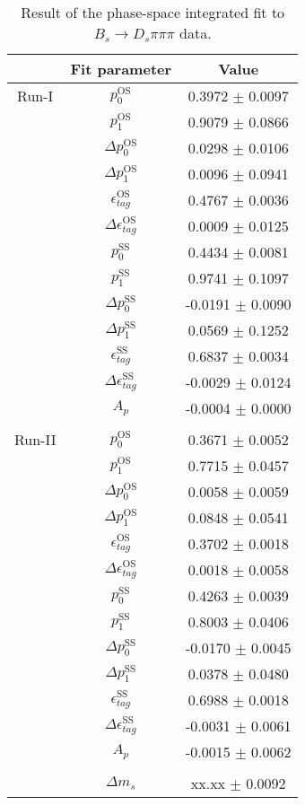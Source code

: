 \begin{table}[h]
\centering
\caption{Result of the phase-space integrated fit to $B_s \to D_s \pi \pi \pi$ data.}
\begin{tabular}{c c c}
\hline
\hline
& Fit parameter & Value \\
\hline
Run-I & $p_{0}^{\text{OS}}$ & 0.3972 $\pm$ 0.0097\\
&$p_{1}^{\text{OS}}$  & 0.9079 $\pm$ 0.0866\\
&$\Delta p_{0}^{\text{OS}}$  & 0.0298 $\pm$ 0.0106\\
&$\Delta p_{1}^{\text{OS}}$  & 0.0096 $\pm$ 0.0941\\
&$\epsilon_{tag}^{\text{OS}}$  & 0.4767 $\pm$ 0.0036\\
&$\Delta\epsilon_{tag}^{\text{OS}}$  & 0.0009 $\pm$ 0.0125\\
& $p_{0}^{\text{SS}}$ & 0.4434 $\pm$ 0.0081\\
&$p_{1}^{\text{SS}}$  & 0.9741 $\pm$ 0.1097\\
&$\Delta p_{0}^{\text{SS}}$  & -0.0191 $\pm$ 0.0090\\
&$\Delta p_{1}^{\text{SS}}$  & 0.0569 $\pm$ 0.1252\\
&$\epsilon_{tag}^{\text{SS}}$  & 0.6837 $\pm$ 0.0034\\
&$\Delta\epsilon_{tag}^{\text{SS}}$  & -0.0029 $\pm$ 0.0124\\
&$A_{p}$ & -0.0004 $\pm$ 0.0000\\
\\
Run-II & $p_{0}^{\text{OS}}$  & 0.3671 $\pm$ 0.0052\\
&$p_{1}^{\text{OS}}$  & 0.7715 $\pm$ 0.0457\\
&$\Delta p_{0}^{\text{OS}}$  & 0.0058 $\pm$ 0.0059\\
&$\Delta p_{1}^{\text{OS}}$  & 0.0848 $\pm$ 0.0541\\
&$\epsilon_{tag}^{\text{OS}}$  & 0.3702 $\pm$ 0.0018\\
&$\Delta\epsilon_{tag}^{\text{OS}}$  & 0.0018 $\pm$ 0.0058\\
& $p_{0}^{\text{SS}}$  & 0.4263 $\pm$ 0.0039\\
&$p_{1}^{\text{SS}}$  & 0.8003 $\pm$ 0.0406\\
&$\Delta p_{0}^{\text{SS}}$  & -0.0170 $\pm$ 0.0045\\
&$\Delta p_{1}^{\text{SS}}$  & 0.0378 $\pm$ 0.0480\\
&$\epsilon_{tag}^{\text{SS}}$  & 0.6988 $\pm$ 0.0018\\
&$\Delta\epsilon_{tag}^{\text{SS}}$  & -0.0031 $\pm$ 0.0061\\
&$A_{p}$ & -0.0015 $\pm$ 0.0062\\
\\
&$\Delta m_{s}$ &  xx.xx  $\pm$ 0.0092\\
\hline
\hline
\end{tabular}
\label{table:timeFit_norm}
\end{table}